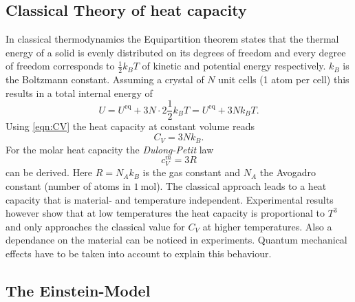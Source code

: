 \subsection{Classical Theory of heat capacity}
\label{subsec:Classical}

In classical thermodynamics the Equipartition theorem states that the thermal energy of a solid is evenly distributed on its degrees of freedom and every degree of 
freedom corresponds to $\frac{1}{2}k_B T$ of kinetic and potential energy respectively. $k_B$ is the Boltzmann constant. 
Assuming a crystal of $N$ unit cells (1 atom per cell) this results in a total internal energy of 
\begin{equation*}
    U = U^\text{eq} + 3N \cdot 2 \frac{1}{2}k_B T = U^\text{eq} + 3Nk_B T.
\end{equation*}
Using \autoref{eqn:CV} the heat capacity at constant volume reads 
\begin{equation*}
    C_V = 3Nk_B.
\end{equation*}
For the molar heat capacity the \textit{Dulong-Petit} law
\begin{equation}
    c^m_V = 3 R
\end{equation}
can be derived. Here $R = N_A k_B$ is the gas constant and $N_A$ the Avogadro constant (number of atoms in $\qty{1}{\mol}$).
The classical approach leads to a heat capacity that is material- and temperature independent. Experimental results however show that at low temperatures the heat capacity is 
proportional to $T^3$ and only approaches the classical value for $C_V$ at higher temperatures. Also a dependance on the material can be noticed in experiments.
Quantum mechanical effects have to be taken into account to explain this behaviour.

\subsection{The Einstein-Model}
\label{subsec:Einstein}
